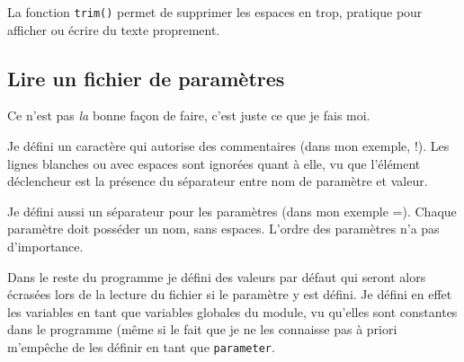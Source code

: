 \documentclass[a4paper,twoside]{article}
\begin{document}
\begin{remarque}
La fonction \texttt{trim()} permet de supprimer les espaces en trop, pratique pour afficher ou écrire du texte proprement.
\end{remarque}

\subsection{Lire un fichier de paramètres}
Ce n'est pas \emph{la} bonne façon de faire, c'est juste ce que je fais moi. 

Je défini un caractère qui autorise des commentaires (dans mon exemple, \og !\fg). Les lignes blanches ou avec espaces sont ignorées quant à elle, vu que l'élément déclencheur est la présence du séparateur entre nom de paramètre et valeur. 

Je défini aussi un séparateur pour les paramètres (dans mon exemple \og =\fg). Chaque paramètre doit posséder un nom, sans espaces. L'ordre des paramètres n'a pas d'importance. 

\begin{remarque}
Dans le reste du programme je défini des valeurs par défaut qui seront alors écrasées lors de la lecture du fichier si le paramètre y est défini. Je défini en effet les variables en tant que variables globales du module, vu qu'elles sont constantes dans le programme (même si le fait que je ne les connaisse pas à priori m'empêche de les définir en tant que \texttt{parameter}.
\end{remarque}
\end{document}
